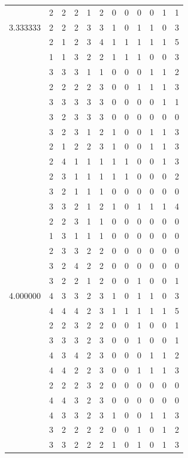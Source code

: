 \documentclass[]{book}
\theoremstyle{definition}
\theoremstyle{definition}
\theoremstyle{definition}
\theoremstyle{remark}
\begin{document}
\begin{table}
{\begin{tabular}[t]{rrrrrrrrrrrr}
 & 2 & 2 & 2 & 1 & 2 & 0 & 0 & 0 & 0 & 1 & 1\\
3.333333 & 2 & 2 & 2 & 3 & 3 & 1 & 0 & 1 & 1 & 0 & 3\\
 & 2 & 1 & 2 & 3 & 4 & 1 & 1 & 1 & 1 & 1 & 5\\
 & 1 & 1 & 3 & 2 & 2 & 1 & 1 & 1 & 0 & 0 & 3\\
 & 3 & 3 & 3 & 1 & 1 & 0 & 0 & 0 & 1 & 1 & 2\\
 & 2 & 2 & 2 & 2 & 3 & 0 & 0 & 1 & 1 & 1 & 3\\
 & 3 & 3 & 3 & 3 & 3 & 0 & 0 & 0 & 0 & 1 & 1\\
 & 3 & 2 & 3 & 3 & 3 & 0 & 0 & 0 & 0 & 0 & 0\\
 & 3 & 2 & 3 & 1 & 2 & 1 & 0 & 0 & 1 & 1 & 3\\
 & 2 & 1 & 2 & 2 & 3 & 1 & 0 & 0 & 1 & 1 & 3\\
 & 2 & 4 & 1 & 1 & 1 & 1 & 1 & 0 & 0 & 1 & 3\\
 & 2 & 3 & 1 & 1 & 1 & 1 & 1 & 0 & 0 & 0 & 2\\
 & 3 & 2 & 1 & 1 & 1 & 0 & 0 & 0 & 0 & 0 & 0\\
 & 3 & 3 & 2 & 1 & 2 & 1 & 0 & 1 & 1 & 1 & 4\\
 & 2 & 2 & 3 & 1 & 1 & 0 & 0 & 0 & 0 & 0 & 0\\
 & 1 & 3 & 1 & 1 & 1 & 0 & 0 & 0 & 0 & 0 & 0\\
 & 2 & 3 & 3 & 2 & 2 & 0 & 0 & 0 & 0 & 0 & 0\\
 & 3 & 2 & 4 & 2 & 2 & 0 & 0 & 0 & 0 & 0 & 0\\
 & 3 & 2 & 2 & 1 & 2 & 0 & 0 & 1 & 0 & 0 & 1\\
4.000000 & 4 & 3 & 3 & 2 & 3 & 1 & 0 & 1 & 1 & 0 & 3\\
 & 4 & 4 & 4 & 2 & 3 & 1 & 1 & 1 & 1 & 1 & 5\\
 & 2 & 2 & 3 & 2 & 2 & 0 & 0 & 1 & 0 & 0 & 1\\
 & 3 & 3 & 3 & 2 & 3 & 0 & 0 & 1 & 0 & 0 & 1\\
 & 4 & 3 & 4 & 2 & 3 & 0 & 0 & 0 & 1 & 1 & 2\\
 & 4 & 4 & 2 & 2 & 3 & 0 & 0 & 1 & 1 & 1 & 3\\
 & 2 & 2 & 2 & 3 & 2 & 0 & 0 & 0 & 0 & 0 & 0\\
 & 4 & 4 & 3 & 2 & 3 & 0 & 0 & 0 & 0 & 0 & 0\\
 & 4 & 3 & 3 & 2 & 3 & 1 & 0 & 0 & 1 & 1 & 3\\
 & 3 & 2 & 2 & 2 & 2 & 0 & 0 & 1 & 0 & 1 & 2\\
 & 3 & 3 & 2 & 2 & 2 & 1 & 0 & 1 & 0 & 1 & 3\\

\end{tabular}}
\end{table}
\end{document}
